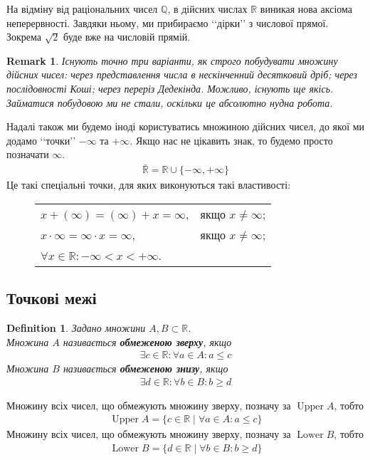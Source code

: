 \documentclass[a4paper, 14pt]{article}
\theoremstyle{theoremdd}
\theoremstyle{theoremdd}
\newtheorem{definition}[theorem]{Definition}
\theoremstyle{theoremdd}
\theoremstyle{theoremdd}
\theoremstyle{theoremdd}
\theoremstyle{theoremdd}
\newtheorem{remark}[theorem]{Remark}
\theoremstyle{theoremdd}
\theoremstyle{theoremdd}
\DeclareMathOperator{\Up}{Upper}
\DeclareMathOperator{\Low}{Lower}
\begin{document}
	На відміну від раціональних чисел $\mathbb{Q}$, в дійсних числах $\mathbb{R}$ виникая нова аксіома неперервності. Завдяки ньому, ми прибираємо \lq\lq дірки\rq\rq \text{} з числової прямої. Зокрема $\sqrt{2}$ буде вже на числовій прямій.
	
	\begin{remark}
	Існують точно три варіанти, як строго побудувати множину дійсних чисел: через представлення числа в нескінченний десятковий дріб; через послідовності Коші; через переріз Дедекінда. Можливо, існують ще якісь. Займатися побудовою ми не стали, оскільки це абсолютно нудна робота.
	\end{remark}
	
	Надалі також ми будемо іноді користуватись множиною дійсних чисел, до якої ми додамо \lq\lq точки\rq\rq \text{} $-\infty$ та $+\infty$. Якщо нас не цікавить знак, то будемо просто позначати $\infty$.
	\begin{align*}
	\bar{\mathbb{R}} = \mathbb{R} \cup \{-\infty, +\infty\}
	\end{align*}
	Це такі спеціальні точки, для яких виконуються такі властивості:
	\begin{figure}[H]
	\centering
	\begin{tabular}{ll}
	$x + (\infty) = (\infty) + x = \infty$, & якщо $x \neq \infty$;\\
	$x \cdot \infty = \infty \cdot x = \infty$, & якщо $x \neq \infty$;\\
	$\forall x \in \mathbb{R}: -\infty < x < +\infty$. &
	\end{tabular}
	\end{figure}

\subsection{Точкові межі}
\begin{definition}
Задано множини $A,B \subset \mathbb{R}$.\\
	Множина $A$ називається \textbf{обмеженою зверху}, якщо
	\begin{align*}
	\exists c \in \mathbb{R}: \forall a \in A: a \leq c
	\end{align*}
	Множина $B$ називається \textbf{обмеженою знизу}, якщо
	\begin{align*}
	\exists d \in \mathbb{R}: \forall b \in B: b \geq d
	\end{align*}
\end{definition}
	Множину всіх чисел, що обмежують множину зверху, позначу за $\Up A$, тобто
	\begin{align*}
	\Up A= \{c \in \mathbb{R} \mid \forall a \in A: a \leq c \}
	\end{align*}
	Множину всіх чисел, що обмежують множину зверху, позначу за $\Low B$, тобто
	\begin{align*}
	\Low B = \{d \in \mathbb{R} \mid \forall b \in B: b \geq d \}
	\end{align*}
	
\end{document}
